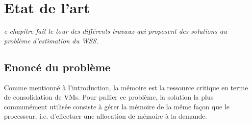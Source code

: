 \let\textcircled=\pgftextcircled
\chapter{Etat de l'art}
\label{chap:etat_de_lart}

\textit{e chapitre fait le tour des différents travaux qui proposent des solutions au problème d'estimation du WSS.}


\newpage    
\section{Enoncé du problème}
Comme mentionné à l'introduction, la mémoire est la ressource critique en terme de consolidation de VMs. Pour pallier ce problème, la solution la plus communément utilisée consiste à gérer la mémoire de la même façon que le processeur, i.e. d'effectuer une allocation de mémoire à la demande. 

